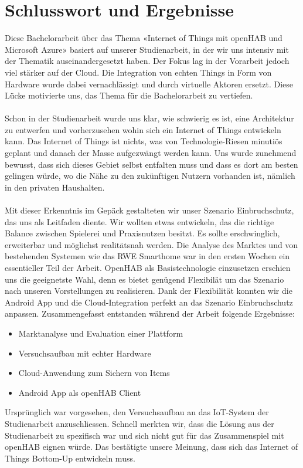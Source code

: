 \section{Schlusswort und Ergebnisse}

Diese Bachelorarbeit über das Thema «Internet of Things mit openHAB und Microsoft Azure» basiert auf unserer Studienarbeit, in der wir uns intensiv mit der Thematik auseinandergesetzt haben. Der Fokus lag in der Vorarbeit jedoch viel stärker auf der Cloud. Die Integration von echten Things in Form von Hardware wurde dabei vernachlässigt und durch virtuelle Aktoren ersetzt. Diese Lücke motivierte uns, das Thema für die Bachelorarbeit zu vertiefen.\\ \\
Schon in der Studienarbeit wurde uns klar, wie schwierig es ist, eine Architektur zu entwerfen und vorherzusehen wohin sich ein Internet of Things entwickeln kann. Das Internet of Things ist nichts, was von Technologie-Riesen minutiös geplant und danach der Masse aufgezwängt werden kann. Uns wurde zunehmend bewusst, dass sich dieses Gebiet selbst entfalten muss und dass es dort am besten gelingen würde, wo die Nähe zu den zukünftigen Nutzern vorhanden ist, nämlich in den privaten Haushalten.\\ \\
Mit dieser Erkenntnis im Gepäck gestalteten wir unser Szenario Einbruchschutz, das uns als Leitfaden diente. Wir wollten etwas entwickeln, das die richtige Balance zwischen Spielerei und Praxisnutzen besitzt. Es sollte erschwinglich, erweiterbar und möglichst realitätsnah werden. Die Analyse des Marktes und von bestehenden Systemen wie das RWE Smarthome war in den ersten Wochen ein essentieller Teil der Arbeit. OpenHAB als Basistechnologie einzusetzen erschien uns die geeignetste Wahl, denn es bietet genügend Flexibilät um das Szenario nach unseren Vorstellungen zu realisieren. Dank der Flexibilität konnten wir die Android App und die Cloud-Integration perfekt an das Szenario Einbruchschutz anpassen. Zusammengefasst entstanden während der Arbeit folgende Ergebnisse:
\begin{itemize}
	\item Marktanalyse und Evaluation einer Plattform
	\item Versuchsaufbau mit echter Hardware
	\item Cloud-Anwendung zum Sichern von Items
	\item Android App als  openHAB Client
\end{itemize}
Ursprünglich war vorgesehen, den Versuchsaufbau an das IoT-System der Studienarbeit anzuschliessen. Schnell merkten wir, dass die Lösung aus der Studienarbeit zu spezifisch war und sich nicht gut für das Zusammenspiel mit openHAB eignen würde. Das bestätigte unsere Meinung, dass sich das Internet of Things Bottom-Up entwickeln muss. 
